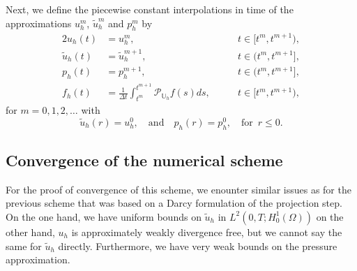 \documentclass[10pt,letterpaper]{amsart}
\newcommand{\tu}{\widetilde{u}}
\newcommand{\dom}{\Omega}
\newcommand{\Uh}{\mathbb{U}_h}
\newcommand{\PUh}{\mathcal{P}_{\Uh}}
\theoremstyle{definition}{\newtheorem{definition}[lemma]{Definition}}
\numberwithin{equation}{section}
\begin{document}
Next, we define the piecewise constant interpolations in time of the approximations $u_h^m$, $\tu_h^m$ and $p_h^m$ by
\begin{alignat}{2}
	u_h(t)& = u_h^m,\qquad &t\in [t^m,t^{m+1}),\label{eq:defuh2}\\
	\widetilde{u}_h(t) &= \widetilde{u}_h^{m+1},\qquad &t\in (t^m,t^{m+1}],\\
	p_h(t)& = p_h^{m+1},\qquad & t\in (t^m,t^{m+1}],\\
	f_h(t)& = \frac{1}{\Delta t}\int_{t^m}^{t^{m+1}}\PUh f(s)ds,\qquad &t\in [t^m,t^{m+1}),\label{eq:defph2}
\end{alignat}
for $m=0,1,2,\dots$ with
\begin{equation*}
	\tu_h(r)=u^0_h,\quad \text{and}\quad p_h(r)=p_h^0,\quad \text{for }\, r\leq 0.
\end{equation*}

\subsection{Convergence of the numerical scheme}
For the proof of convergence of this scheme, we enounter similar issues as for the previous scheme that was based on a Darcy formulation of the projection step. On the one hand, we have uniform bounds on $\tu_h$ in $L^2(0,T;H^1_0(\dom))$ on the other hand, $u_h$ is approximately weakly divergence free, but we cannot say the same for $\tu_h$ directly. Furthermore, we have very weak bounds on the pressure approximation.
\end{document}
